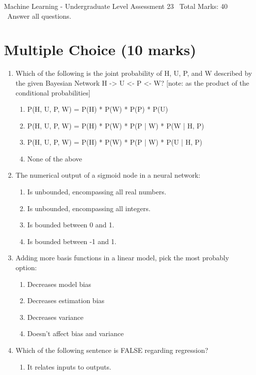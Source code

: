 \documentclass[12pt]{article}
\begin{document}
\begin{center}
Machine Learning - Undergraduate Level Assessment 23 \
Total Marks: 40 \
Answer all questions.
\end{center}

\section*{Multiple Choice (10 marks)}
\begin{enumerate}[label=\arabic*.]
\item Which of the following is the joint probability of H, U, P, and W described by the given Bayesian Network H -\textgreater{} U \textless{}- P \textless{}- W? [note: as the product of the conditional probabilities]
\begin{enumerate}[label=(\alph*)]
    \item P(H, U, P, W) = P(H) * P(W) * P(P) * P(U)
    \item P(H, U, P, W) = P(H) * P(W) * P(P | W) * P(W | H, P)
    \item P(H, U, P, W) = P(H) * P(W) * P(P | W) * P(U | H, P)
    \item None of the above
\end{enumerate}
\item The numerical output of a sigmoid node in a neural network:
\begin{enumerate}[label=(\alph*)]
    \item Is unbounded, encompassing all real numbers.
    \item Is unbounded, encompassing all integers.
    \item Is bounded between 0 and 1.
    \item Is bounded between -1 and 1.
\end{enumerate}
\item Adding more basis functions in a linear model, pick the most probably option:
\begin{enumerate}[label=(\alph*)]
    \item Decreases model bias
    \item Decreases estimation bias
    \item Decreases variance
    \item Doesn't affect bias and variance
\end{enumerate}
\item Which of the following sentence is FALSE regarding regression?
\begin{enumerate}[label=(\alph*)]
    \item It relates inputs to outputs.

\end{enumerate}
\end{enumerate}
\end{document}
